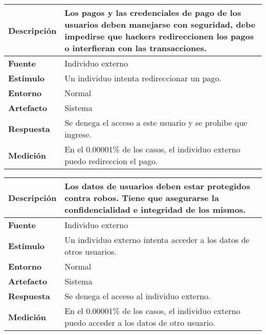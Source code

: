 \begin{center}
  \begin{tabular}{| l | p{10cm} | }
    \hline
  \textbf{Descripción} & Los pagos y las credenciales de pago de los usuarios deben manejarse con seguridad, debe impedirse que hackers redireccionen los pagos o interfieran con las transacciones.\\  \hline
  \textbf{Fuente} & Individuo externo\\  \hline
  \textbf{Estímulo} & Un individuo intenta redireccionar un pago.\\  \hline
  \textbf{Entorno} & Normal\\  \hline
  \textbf{Artefacto} & Sistema\\  \hline
  \textbf{Respuesta} & Se denega el acceso a este usuario y se prohibe que ingrese.\\  \hline
  \textbf{Medición} & En el 0.00001\% de los casos, el individuo externo puedo redireccion el pago.\\  \hline
  \end{tabular}
\end{center} 

\begin{center}
  \begin{tabular}{| l | p{10cm} | }
    \hline
  \textbf{Descripción} & Los datos de usuarios deben estar protegidos contra robos. Tiene que asegurarse la confidencialidad e integridad de los mismos. \\  \hline
  \textbf{Fuente} & Individuo externo\\  \hline
  \textbf{Estímulo} & Un individuo externo intenta acceder a los datos de otros usuarios.\\  \hline
  \textbf{Entorno} & Normal\\  \hline
  \textbf{Artefacto} & Sistema\\  \hline
  \textbf{Respuesta} & Se denega el acceso al individuo externo.\\  \hline
  \textbf{Medición} & En el 0.00001\% de los casos, el individuo externo puedo acceder a los datos de otro usuario.\\  \hline
  \end{tabular}
\end{center} 

